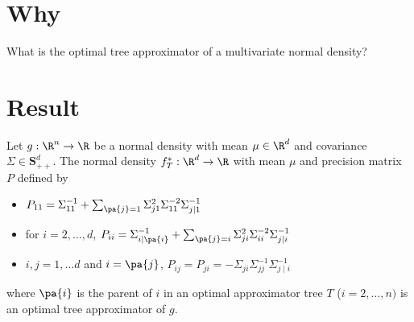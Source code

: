 

\section*{Why}

What is the optimal tree approximator of a multivariate normal density?

\section*{Result}



\begin{proposition}
Let $g: \R ^n \to \R $ be a normal density with mean $\mu \in \R ^d$ and covariance $\Sigma  \in \mathbf{S} ^d_{++}$.
The normal density $f^*_T: \R ^d \to \R $ with mean $\mu $ and precision matrix $P$ defined by
    \begin{itemize}
      \item $P_{11} = \Sigma _{11}^{-1} + \sum_{\pa{j} = 1} \Sigma _{j1}^2\Sigma _{11}^{-2}\Sigma _{j\mid 1}^{-1}$
      \item for $i = 2, \dots , d$, $P_{ii} = \Sigma _{i\mid\pa{i}}^{-1} + \sum_{\pa{j} = i} \Sigma _{ji}^2\Sigma _{ii}^{-2}\Sigma _{j\mid i}^{-1}$
      \item $i, j = 1, \dots  d$ and $i = \pa{j}$, $P_{ij} = P_{ji} = -\Sigma _{ji}\Sigma _{jj}^{-1}\Sigma _{j \mid i}^{-1}$
    \end{itemize}
where $\pa{i}$ is the parent of $i$ in an optimal approximator tree $T$ ($i = 2, \dots , n)$ is an optimal tree approximator of $g$.

\end{proposition}

